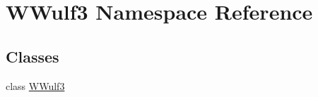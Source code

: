 \hypertarget{namespace_w_wulf3}{\section{W\-Wulf3 Namespace Reference}
\label{namespace_w_wulf3}
}
\subsection*{Classes}
\begin{DoxyCompactItemize}
\item 
class \hyperlink{class_w_wulf3_1_1_w_wulf3}{W\-Wulf3}
\end{DoxyCompactItemize}
